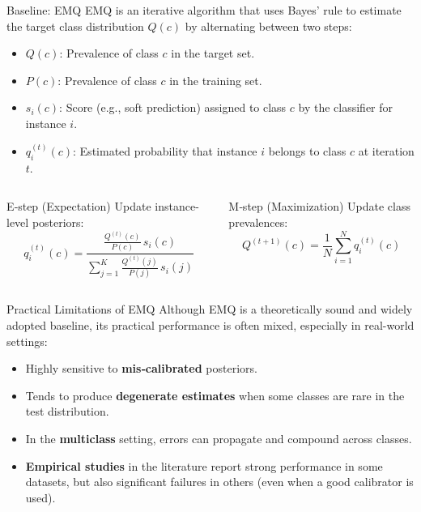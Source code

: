 \documentclass[aspectratio=169]{beamer}
\begin{document}
\begin{frame}{Baseline: EMQ}
  EMQ is an iterative algorithm that uses Bayes’ rule to estimate the target class distribution $Q(c)$ by alternating between two steps:
  
  \begin{itemize}
    \item $Q(c)$: Prevalence of class $c$ in the target set.
    \item $P(c)$: Prevalence of class $c$ in the training set.
    \item $s_i(c)$: Score (e.g., soft prediction) assigned to class $c$ by the classifier for instance $i$.
    \item $q_i^{(t)}(c)$: Estimated probability that instance $i$ belongs to class $c$ at iteration $t$.
  \end{itemize}

  \begin{columns}
    \begin{column}{0.4\textwidth}
      \begin{block}{E‑step (Expectation)}
        \small
        Update instance-level posteriors:
        $$q_i^{(t)}(c)=\frac{\frac{Q^{(t)}(c)}{P(c)}\,s_i(c)}{\sum_{j=1}^{K}\frac{Q^{(t)}(j)}{P(j)}\,s_i(j)}$$
      \end{block}
    \end{column}
    \begin{column}{0.4\textwidth}
      \begin{block}{M‑step (Maximization)}
        \small
        Update class prevalences:
        $$Q^{(t+1)}(c)=\frac{1}{N}\sum_{i=1}^{N}q_i^{(t)}(c)$$
      \end{block}
    \end{column}
  \end{columns}
\end{frame}


\begin{frame}{Practical Limitations of EMQ}
  Although EMQ is a theoretically sound and widely adopted baseline, its practical performance is often mixed, especially in real-world settings:

  \begin{itemize}
    \item Highly sensitive to \textbf{mis‑calibrated} posteriors.
    \item Tends to produce \textbf{degenerate estimates} when some classes are rare in the test distribution.
    \item In the \textbf{multiclass} setting, errors can propagate and compound across classes.
    \item \textbf{Empirical studies} in the literature report strong performance in some datasets, but also significant failures in others (even when a good calibrator is used).
  \end{itemize}
\end{frame}
\end{document}
